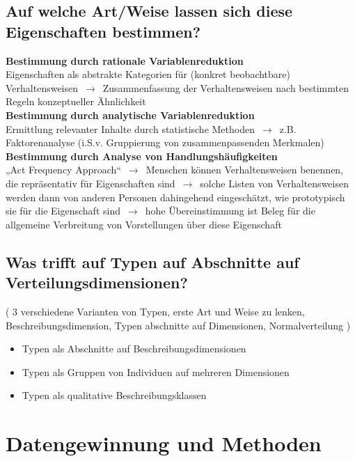 \documentclass[a6paper,9pt,DIV=14]{scrartcl}
\begin{document}
\subsection{Auf welche Art/Weise lassen sich diese Eigenschaften bestimmen?}
    \textbf{Bestimmung durch rationale Variablenreduktion} \\
    Eigenschaften als abstrakte Kategorien für (konkret beobachtbare) Verhaltensweisen $\,\to\,$ Zusammenfassung der Verhaltensweisen nach bestimmten Regeln konzeptueller Ähnlichkeit\\
    \textbf{Bestimmung durch analytische Variablenreduktion} \\
    Ermittlung relevanter Inhalte durch statistische Methoden $\,\to\,$ z.B. Faktorenanalyse (i.S.v. Gruppierung von zusammenpassenden Merkmalen)\\
    \textbf{Bestimmung durch Analyse von Handlungshäufigkeiten} \\
    „Act Frequency Approach“ $\,\to\,$ Menschen können Verhaltensweisen benennen, die repräsentativ für Eigenschaften sind $\,\to\,$ solche Listen von Verhaltensweisen werden dann von anderen Personen dahingehend eingeschätzt, wie prototypisch sie für die Eigenschaft sind $\,\to\,$ hohe Übereinstimmung ist Beleg für die allgemeine Verbreitung von Vorstellungen über diese Eigenschaft
\subsection{Was trifft auf Typen auf Abschnitte auf Verteilungsdimensionen?}%
    ( 3 verschiedene Varianten von Typen, erste Art und Weise zu lenken, Beschreibungsdimension, Typen abschnitte auf Dimensionen, Normalverteilung )
    \begin{itemize}\itemsep-0.5ex
        \item Typen als Abschnitte auf Beschreibungsdimensionen %
        \item Typen als Gruppen von Individuen auf mehreren Dimensionen
        \item Typen als qualitative Beschreibungsklassen
    \end{itemize}

\section{Datengewinnung und Methoden}
\end{document}
